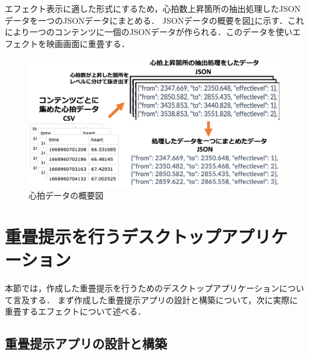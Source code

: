 エフェクト表示に適した形式にするため，心拍数上昇箇所の抽出処理したJSONデータを一つのJSONデータにまとめる．
JSONデータの概要を図\ref{gaiyou}に示す．これにより一つのコンテンツに一個のJSONデータが作られる．このデータを使いエフェクトを映画画面に重畳する．

\begin{figure}[H]
    \centering
    \includegraphics[width=16cm]{images/chapter3/system.png}
    \caption{心拍データの概要図}
    \label{gaiyou}
\end{figure}


\section{重畳提示を行うデスクトップアプリケーション}

 本節では，作成した重畳提示を行うためのデスクトップアプリケーションについて言及する．
 まず作成した重畳提示アプリの設計と構築について，次に実際に重畳するエフェクトについて述べる．

\subsection{重畳提示アプリの設計と構築}


